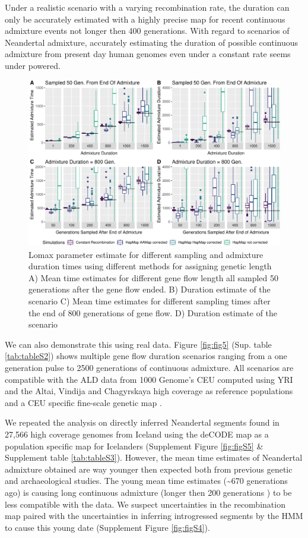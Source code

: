 \documentclass[]{article}
\begin{document}
Under a realistic scenario with a varying recombination
rate, the duration can only be accurately estimated with a highly
precise map for recent continuous admixture events not longer then 400
generations. With regard to scenarios of Neandertal admixture,
accurately estimating the duration of possible continuous admixture from
present day human genomes even under a constant rate seems
under powered. 


\begin{figure}
\centering
\includegraphics{Admixture_Time_Inference_Paper_Draft_files/figure-latex/fig4-1.pdf}
\caption{\label{fig:fig4} Lomax parameter estimate for different sampling and
admixture duration times using different methods for assigning genetic
length A) Mean time estimates for different gene
flow length all sampled 50 generations after the gene flow ended. B)
Duration estimate of the scenario C) Mean time estimates for different sampling times after the end of 800
generations of gene flow. D) Duration estimate of the scenario}
\end{figure}


We can also demonstrate this using real data.
Figure \ref{fig:fig5} (Sup. table \ref{tab:tableS2}) shows multiple gene flow duration scenarios ranging from a one generation pulse to 2500 generations of continuous admixture. All scenarios are compatible with the ALD data from 1000 Genome's CEU computed using YRI and the Altai, Vindija and Chagyrskaya high coverage as reference populations and a CEU specific fine-scale genetic map \citep{spence_inference_2019}.

We repeated the analysis on directly inferred Neandertal segments found in 27,566 high coverage genomes from Iceland \citep{skov_nature_2020} using the deCODE map \citep{kong_fine-scale_2010} as a population specific map for Icelanders (Supplement Figure \ref{fig:figS5} \& Supplement table \ref{tab:tableS3}). However, the mean time estimates of Neandertal admixture obtained are way younger then expected both from previous genetic and archaeological studies. The young mean time estimates (\textasciitilde{}670 generations ago) is causing long continuous admixture (longer then 200 generations ) to be less compatible with the data. We suspect uncertainties in the recombination map paired with the uncertainties in inferring introgressed segments by the HMM to cause this young date (Supplement Figure \ref{fig:figS4}).
\end{document}
